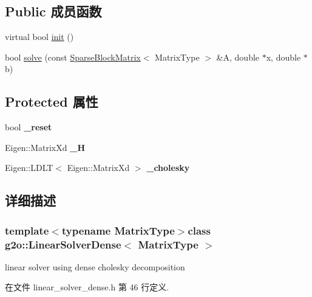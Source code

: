 \subsection*{Public 成员函数}
\begin{DoxyCompactItemize}
\item 
virtual bool \hyperlink{classg2o_1_1LinearSolverDense_a24f68ecd4b022269dbfc4d990eb5c57b}{init} ()
\item 
bool \hyperlink{classg2o_1_1LinearSolverDense_a8b6eafa6e53b9f705a4e8eb436eeb403}{solve} (const \hyperlink{classg2o_1_1SparseBlockMatrix}{Sparse\-Block\-Matrix}$<$ Matrix\-Type $>$ \&A, double $\ast$x, double $\ast$b)
\end{DoxyCompactItemize}
\subsection*{Protected 属性}
\begin{DoxyCompactItemize}
\item 
\hypertarget{classg2o_1_1LinearSolverDense_a2d82ac52c9c24501cccee3ef3cb575fe}{bool {\bfseries \-\_\-reset}}\label{classg2o_1_1LinearSolverDense_a2d82ac52c9c24501cccee3ef3cb575fe}

\item 
\hypertarget{classg2o_1_1LinearSolverDense_a5ca6a1f2358ce0620dbdbae3fdc9fc99}{Eigen\-::\-Matrix\-Xd {\bfseries \-\_\-\-H}}\label{classg2o_1_1LinearSolverDense_a5ca6a1f2358ce0620dbdbae3fdc9fc99}

\item 
\hypertarget{classg2o_1_1LinearSolverDense_a20fc35e2f25107a6e36211861034aae0}{Eigen\-::\-L\-D\-L\-T$<$ Eigen\-::\-Matrix\-Xd $>$ {\bfseries \-\_\-cholesky}}\label{classg2o_1_1LinearSolverDense_a20fc35e2f25107a6e36211861034aae0}

\end{DoxyCompactItemize}


\subsection{详细描述}
\subsubsection*{template$<$typename Matrix\-Type$>$class g2o\-::\-Linear\-Solver\-Dense$<$ Matrix\-Type $>$}

linear solver using dense cholesky decomposition 

在文件 linear\-\_\-solver\-\_\-dense.\-h 第 46 行定义.



